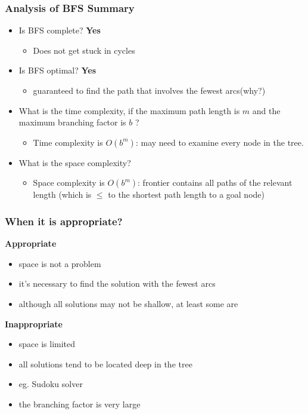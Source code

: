\documentclass{article}
\theoremstyle{definition}
\theoremstyle{example}
\begin{document}
\subsubsection*{Analysis of BFS Summary}
\begin{itemize}
	\item Is BFS complete? {\bf Yes}
	\begin{itemize}
		\item Does not get stuck in cycles
	\end{itemize} 
	\item Is BFS optimal? {\bf Yes}
	\begin{itemize}
		\item guaranteed to find the path that involves the fewest arcs(why?)
	\end{itemize}
	\item What is the time complexity, if the maximum path length is $ m $ and the maximum branching factor is $ b $ ?
	\begin{itemize}
		\item Time complexity is $ O(b^m) $: may need to examine every node in the tree.
	\end{itemize}
	\item What is the space complexity?
	\begin{itemize}
		\item Space complexity is $ O(b^m) $: frontier contains all paths of the relevant length (which is $ \leq $ to the shortest path length to a goal node)
	\end{itemize}
\end{itemize}

\subsubsection*{When it is appropriate?}
\begin{multicols}{2}
	{\bf Appropriate}
	\begin{itemize}
		\item space is not a problem
		\item it's necessary to find the solution with the fewest arcs
		\item although all solutions may not be shallow, at least some are
	\end{itemize}
	{\bf Inappropriate}
	\begin{itemize}
		\item space is limited
		\item all solutions tend to be located deep in the tree
		\item eg. Sudoku solver
		\item the branching factor is very large
	\end{itemize}
\end{multicols}
\end{document}
